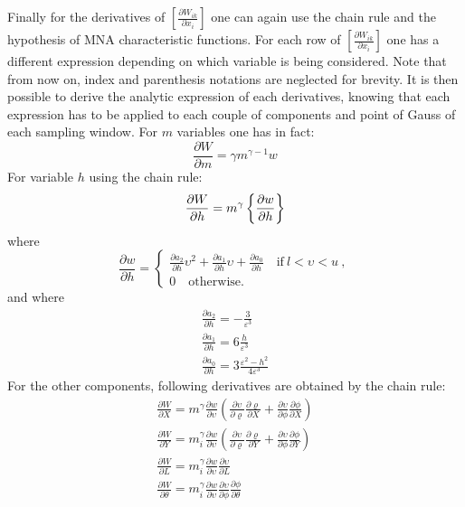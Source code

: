 Finally for the derivatives of $\left[\frac{\partial W_{ik}}{\partial x_i}\right]$ one can again use the chain rule and the hypothesis of MNA characteristic functions. For each row of  $\left[\frac{\partial W_{ik}}{\partial x_i}\right]$  one has a different expression depending on which variable is being considered. Note that from now on, index and parenthesis notations are neglected for brevity. It is then possible to derive the analytic expression of each derivatives, knowing that each expression has to be applied to each couple of components and point of Gauss of each sampling window. For $m$ variables one has in fact:
\begin{equation}
    \frac{\partial W}{\partial m}=\gamma m^{\gamma-1}w
\end{equation}
For variable $h$ using the chain rule:
\begin{equation}
    \frac{\partial W}{\partial h}= m^{\gamma} \left\{{\frac{\partial w}{\partial h}}\right\}
\end{equation}
where
\begin{equation}
     \frac{\partial w}{\partial h}=\begin{cases}
         \frac{\partial a_2}{\partial h}\upsilon^2+\frac{\partial a_1}{\partial h}\upsilon+\frac{\partial a_0}{\partial h} \quad \text{if} \ l<\upsilon<u\ ,\\
         0 \quad \text{otherwise.}
    \end{cases}
\end{equation}
and where 
\begin{eqnarray}
\frac{\partial a_2}{\partial h}=-\frac{3}{\varepsilon^3}\\
\frac{\partial a_1}{\partial h}=6\frac{h}{\varepsilon^3}\\
\frac{\partial a_0}{\partial h}=3\frac{ \varepsilon^2-h^2}{4\varepsilon^3}
\end{eqnarray}
For the other components, following derivatives are obtained by the chain rule:
\begin{eqnarray}
\frac{\partial W}{\partial X}=m^\gamma\frac{\partial w}{\partial \upsilon}\left(\frac{\partial \upsilon}{\partial \varrho}\frac{\partial \varrho}{\partial X}+\frac{\partial \upsilon}{\partial \phi}\frac{\partial \phi}{\partial X}\right)\\
\frac{\partial W}{\partial Y}=m_i^\gamma\frac{\partial w}{\partial \upsilon}\left(\frac{\partial \upsilon}{\partial \varrho}\frac{\partial \varrho}{\partial Y}+\frac{\partial \upsilon}{\partial \phi}\frac{\partial \phi}{\partial Y}\right)\\
\frac{\partial W}{\partial L}=m_i^\gamma\frac{\partial w}{\partial \upsilon}\frac{\partial \upsilon}{\partial L}\\
\frac{\partial W}{\partial \theta}=m_i^\gamma\frac{\partial w}{\partial \upsilon}\frac{\partial \upsilon}{\partial \phi}\frac{\partial \phi}{\partial \theta}
\end{eqnarray}

